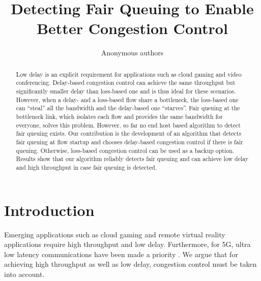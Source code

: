 \documentclass[runningheads]{llncs}
\begin{document}
%
\title{Detecting Fair Queuing to Enable Better Congestion Control}
%
%
\author{Anonymous authors}
%
%
%
\maketitle              %
%
\begin{abstract}
Low delay is an explicit requirement for applications such as cloud gaming and video conferencing. Delay-based congestion control can achieve the same throughput but significantly smaller delay than loss-based one and is thus ideal for these scenarios. However, when a delay- and a loss-based flow share a bottleneck, the loss-based one can ``steal'' all the bandwidth and the delay-based one ``starves''. Fair queuing at the bottleneck link, which isolates each flow and provides the same bandwidth for everyone, solves this problem. However, so far no end host based algorithm to detect fair queuing exists. Our contribution is the development of an algorithm that detects fair queuing at flow startup and chooses delay-based congestion control if there is fair queuing. Otherwise, loss-based congestion control can be used as a backup option. Results show that our algorithm reliably detects fair queuing and can achieve low delay and high throughput in case fair queuing is detected. 

\end{abstract}
%
%
%
\section{Introduction}
\label{sec:introduction}

Emerging applications such as cloud gaming \cite{jarschel_evaluation_2011} and remote virtual reality \cite{elbamby_toward_2018} applications require high throughput and low delay. Furthermore, for 5G, ultra low latency communications have been made a priority \cite{li_5g_2018}. We argue that for achieving high throughput as well as low delay, congestion control must be taken into account. 
\end{document}
